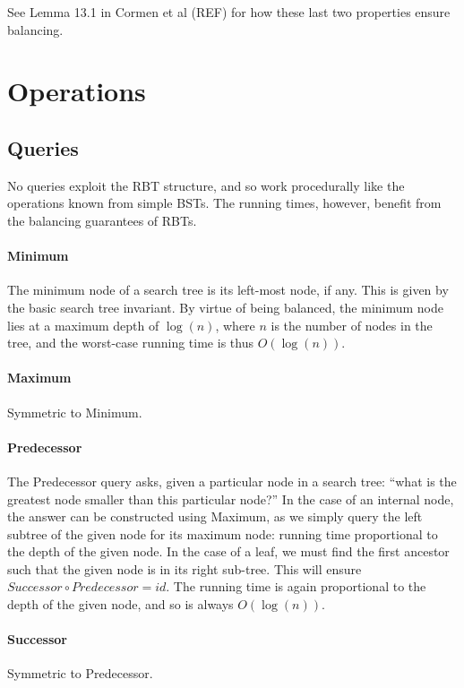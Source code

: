 \documentclass[a4paper, 12pt]{article}
\begin{document}
See Lemma 13.1 in Cormen et al (REF) for how these last two properties
ensure balancing.

\section{Operations}

\subsection{Queries}

No queries exploit the RBT structure, and so work procedurally like the
operations known from simple BSTs. The running times, however, benefit
from the balancing guarantees of RBTs.

\paragraph{Minimum} The minimum node of a search tree is its left-most
node, if any. This is given by the basic search tree invariant. By
virtue of being balanced, the minimum node lies at a maximum depth of
$\log(n)$, where $n$ is the number of nodes in the tree, and the
worst-case running time is thus $O(\log(n))$.

\paragraph{Maximum} Symmetric to Minimum.

\paragraph{Predecessor} The Predecessor query asks, given a particular
node in a search tree: ``what is the greatest node smaller than this
particular node?'' In the case of an internal node, the answer can be
constructed using Maximum, as we simply query the left subtree of the
given node for its maximum node: running time proportional to the
depth of the given node. In the case of a leaf, we must find the first
ancestor such that the given node is in its right sub-tree. This will
ensure $Successor \circ Predecessor = id$. The running time is again
proportional to the depth of the given node, and so is always
$O(\log(n))$.

\paragraph{Successor} Symmetric to Predecessor.
\end{document}
